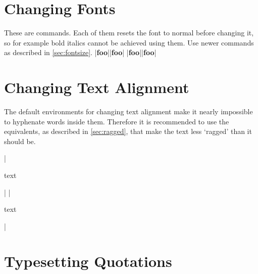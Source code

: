 \section{Changing Fonts}

These are  commands. Each of them resets the font to normal
before changing it, so for example bold italics cannot be achieved using them.
Use newer commands as described in \autoref{sec:fontsize}.
\chto|{\bf foo}||\textbf{foo}|
\chto|{\bf foo}||{\bfseries foo}|

\section{Changing Text Alignment}

The default  environments for changing text alignment make it
nearly impossible to hyphenate words inside them. Therefore it is recommended
to use the  equivalents, as described in
\autoref{sec:ragged}, that make the text less \enquote*{ragged} than it
should be.
\begin{chktexignore}  
\chto|\begin{center}
  text
\end{center}|
|\usepackage{ragged2e}
\begin{Center}
  text
\end{Center}|
\end{chktexignore}

\section{Typesetting Quotations}

